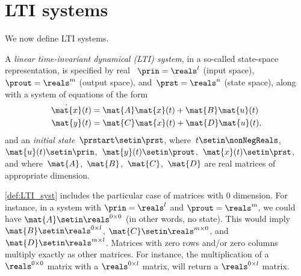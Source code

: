 
\section{LTI systems}
\label{sec:LTI-systems}

We now define LTI systems.



\begin{definition}
    \label{def:LTI_syst}
    A \emph{linear time-invariant dynamical (LTI) system}, in a so-called state-space representation, is specified by real ~$\prin=\reals^l$ (input space),~$\prout=\reals^m$ (output space), and~$\prst=\reals^n$ (state space), along with a system of equations of the form
    \begin{align}
        \dot{\mat{x}}(t) & = \mat{A}\mat{x}(t) + \mat{B}\mat{u}(t) \label{eq:LTI-system-dyn} \\
        \mat{y}(t)       & = \mat{C}\mat{x}(t) + \mat{D}\mat{u}(t) \label{eq:LTI-system-ro},
    \end{align}
    and an \emph{initial state}~$\prstart\setin \prst$, where~$t \setin \nonNegReals$,~$\mat{u}(t) \setin \prin$,~$\mat{y}(t) \setin \prout$,~$\mat{x}(t) \setin \prst$, and where~$\mat{A}$,~$\mat{B}$,~$\mat{C}$,~$\mat{D}$ are real matrices of appropriate dimension.
\end{definition}
\begin{remark}
    \cref{def:LTI_syst} includes the particular case of matrices with 0 dimension.
    For instance, in a system with $\prin=\reals^l$ and $\prout=\reals^m$, we could have $\mat{A}\setin \reals^{0\times 0}$ (in other words, no state).
    This would imply $\mat{B}\setin \reals^{0\times l}$, $\mat{C}\setin \reals^{m\times 0}$, and $\mat{D}\setin \reals^{m\times l}$.
    Matrices with zero rows and/or zero columns multiply exactly as other matrices.
    For instance, the multiplication of a $\reals^{0\times 0}$ matrix with a $\reals^{0\times l}$ matrix, will return a $\reals^{0\times l}$ matrix.
\end{remark}

